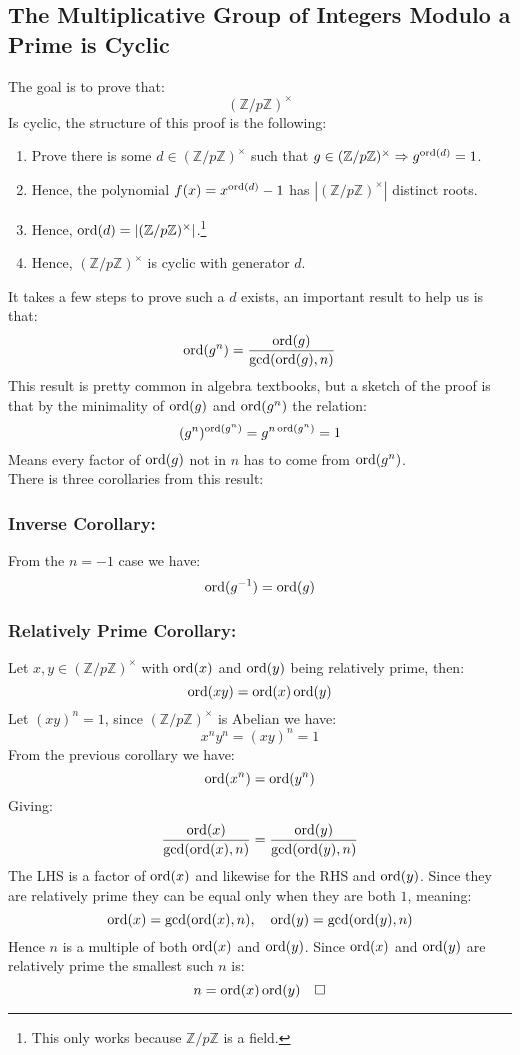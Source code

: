 \subsection{The Multiplicative Group of Integers Modulo a Prime is Cyclic}
\label{appx:cycle-multiplicative-group}
The goal is to prove that:
\[(\mathbb{Z}/p\mathbb{Z})^\times\]
Is cyclic, the structure of this proof is the following:
\begin{enumerate}
	\item Prove there is some $d\in(\mathbb{Z}/p\mathbb{Z})^\times$ such that $g\in(\mathbb{Z}/p\mathbb{Z})^\times \Rightarrow g^{\operatorname{ord}(d)}=1$.
	\item Hence, the polynomial $f(x)=x^{\operatorname{ord}(d)}-1$ has $|(\mathbb{Z}/p\mathbb{Z})^\times|$ distinct roots.
	\item Hence, $\operatorname{ord}(d)=|(\mathbb{Z}/p\mathbb{Z})^\times|$.\footnote{This only works because $\mathbb{Z}/p\mathbb{Z}$ is a field.}
	\item Hence, $(\mathbb{Z}/p\mathbb{Z})^\times$ is cyclic with generator $d$.
\end{enumerate}
It takes a few steps to prove such a $d$ exists,
an important result to help us is that:
\[\operatorname{ord}(g^n) = \frac{\operatorname{ord}(g)}{\gcd(\operatorname{ord}(g),n)}\]
This result is pretty common in algebra textbooks, 
but a sketch of the proof is that by the minimality of $\operatorname{ord}(g)$ and $\operatorname{ord}(g^n)$ the relation:
\[(g^{n})^{\operatorname{ord}(g^n)} = g^{n\operatorname{ord}(g^n)}=1\] 
Means every factor of $\operatorname{ord}(g)$ not in $n$ has to come from $\operatorname{ord}(g^n)$.
\\
There is three corollaries from this result:

\subsubsection{Inverse Corollary:}
From the $n=-1$ case we have:
\[\operatorname{ord}(g^{-1})=\operatorname{ord}(g)\]

\subsubsection{Relatively Prime Corollary:}
Let $x,y\in(\mathbb{Z}/p\mathbb{Z})^\times$ with $\operatorname{ord}(x)$ and $\operatorname{ord}(y)$ being relatively prime,
then:
\[\operatorname{ord}(xy) = \operatorname{ord}(x)\operatorname{ord}(y)\]
Let $(xy)^n=1$, since $(\mathbb{Z}/p\mathbb{Z})^\times$ is Abelian we have:
\[x^ny^n = (xy)^n=1\]
From the previous corollary we have:
\[\operatorname{ord}(x^n) = \operatorname{ord}(y^n)\]
Giving:
\[\frac{\operatorname{ord}(x)}{\gcd(\operatorname{ord}(x),n)}=\frac{\operatorname{ord}(y)}{\gcd(\operatorname{ord}(y),n)}\]
The LHS is a factor of $\operatorname{ord}(x)$ and likewise for the RHS and $\operatorname{ord}(y)$.
Since they are relatively prime they can be equal only when they are both $1$,
meaning:
\[\operatorname{ord}(x) = \gcd(\operatorname{ord}(x),n),\quad\operatorname{ord}(y)=\gcd(\operatorname{ord}(y),n)\]
Hence $n$ is a multiple of both $\operatorname{ord}(x)$ and $\operatorname{ord}(y)$.
Since $\operatorname{ord}(x)$ and $\operatorname{ord}(y)$ are relatively prime the smallest such $n$ is:
\[n=\operatorname{ord}(x)\operatorname{ord}(y)\quad\square\]

